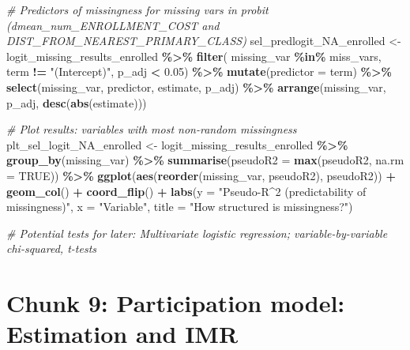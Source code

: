 \documentclass[
]{article}
\newenvironment{Shaded}{\begin{snugshade}}{\end{snugshade}}
\newcommand{\AttributeTok}[1]{\textcolor[rgb]{0.13,0.29,0.53}{#1}}
\newcommand{\CommentTok}[1]{\textcolor[rgb]{0.56,0.35,0.01}{\textit{#1}}}
\newcommand{\ConstantTok}[1]{\textcolor[rgb]{0.56,0.35,0.01}{#1}}
\newcommand{\FloatTok}[1]{\textcolor[rgb]{0.00,0.00,0.81}{#1}}
\newcommand{\FunctionTok}[1]{\textcolor[rgb]{0.13,0.29,0.53}{\textbf{#1}}}
\newcommand{\NormalTok}[1]{#1}
\newcommand{\OtherTok}[1]{\textcolor[rgb]{0.56,0.35,0.01}{#1}}
\newcommand{\SpecialCharTok}[1]{\textcolor[rgb]{0.81,0.36,0.00}{\textbf{#1}}}
\newcommand{\StringTok}[1]{\textcolor[rgb]{0.31,0.60,0.02}{#1}}
\begin{document}
\begin{Shaded}
\begin{Highlighting}[]
\CommentTok{\# Predictors of missingness for missing vars in probit (dmean\_num\_ENROLLMENT\_COST and DIST\_FROM\_NEAREST\_PRIMARY\_CLASS)}
\NormalTok{sel\_predlogit\_NA\_enrolled }\OtherTok{\textless{}{-}}\NormalTok{ logit\_missing\_results\_enrolled }\SpecialCharTok{\%\textgreater{}\%} 
  \FunctionTok{filter}\NormalTok{(}
\NormalTok{    missing\_var }\SpecialCharTok{\%in\%}\NormalTok{ miss\_vars,}
\NormalTok{    term }\SpecialCharTok{!=} \StringTok{"(Intercept)"}\NormalTok{,}
\NormalTok{    p\_adj }\SpecialCharTok{\textless{}} \FloatTok{0.05}\NormalTok{) }\SpecialCharTok{\%\textgreater{}\%} 
  \FunctionTok{mutate}\NormalTok{(}\AttributeTok{predictor =}\NormalTok{ term) }\SpecialCharTok{\%\textgreater{}\%}
  \FunctionTok{select}\NormalTok{(missing\_var, predictor, estimate, p\_adj) }\SpecialCharTok{\%\textgreater{}\%} 
  \FunctionTok{arrange}\NormalTok{(missing\_var, p\_adj, }\FunctionTok{desc}\NormalTok{(}\FunctionTok{abs}\NormalTok{(estimate)))}

\CommentTok{\# Plot results: variables with most non{-}random missingness}
\NormalTok{plt\_sel\_logit\_NA\_enrolled }\OtherTok{\textless{}{-}}\NormalTok{ logit\_missing\_results\_enrolled }\SpecialCharTok{\%\textgreater{}\%}
  \FunctionTok{group\_by}\NormalTok{(missing\_var) }\SpecialCharTok{\%\textgreater{}\%}
  \FunctionTok{summarise}\NormalTok{(}\AttributeTok{pseudoR2 =} \FunctionTok{max}\NormalTok{(pseudoR2, }\AttributeTok{na.rm =} \ConstantTok{TRUE}\NormalTok{)) }\SpecialCharTok{\%\textgreater{}\%}
  \FunctionTok{ggplot}\NormalTok{(}\FunctionTok{aes}\NormalTok{(}\FunctionTok{reorder}\NormalTok{(missing\_var, pseudoR2), pseudoR2)) }\SpecialCharTok{+}
  \FunctionTok{geom\_col}\NormalTok{() }\SpecialCharTok{+}
  \FunctionTok{coord\_flip}\NormalTok{() }\SpecialCharTok{+}
  \FunctionTok{labs}\NormalTok{(}\AttributeTok{y =} \StringTok{"Pseudo{-}R\^{}2 (predictability of missingness)"}\NormalTok{,}
       \AttributeTok{x =} \StringTok{"Variable"}\NormalTok{,}
       \AttributeTok{title =} \StringTok{"How structured is missingness?"}\NormalTok{)}


\CommentTok{\# Potential tests for later: Multivariate logistic regression; variable{-}by{-}variable chi{-}squared, t{-}tests}
\end{Highlighting}
\end{Shaded}

\section*{Chunk 9: Participation model: Estimation and IMR}\label{chunk-9-participation-model-estimation-and-imr}
\end{document}
